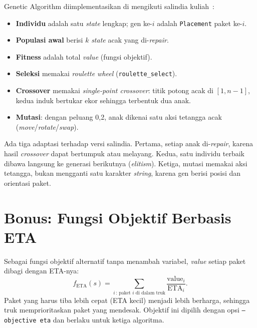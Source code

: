 Genetic Algorithm diimplementasikan di  mengikuti
salindia kuliah~\cite{kkif2026slides}:
\begin{itemize}
	\item \textbf{Individu} adalah satu \textit{state} lengkap; gen ke-$i$ adalah
	\texttt{Placement} paket ke-$i$.
	\item \textbf{Populasi awal} berisi $k$ \textit{state} acak yang di-\textit{repair}.
	\item \textbf{Fitness} adalah total \textit{value} (fungsi objektif).
	\item \textbf{Seleksi} memakai \textit{roulette wheel} (\texttt{roulette\_select}).
	\item \textbf{Crossover} memakai \textit{single-point crossover}: titik potong acak di
	$[1,n-1]$, kedua induk bertukar ekor sehingga terbentuk dua anak.
	\item \textbf{Mutasi}: dengan peluang 0,2, anak dikenai satu aksi tetangga acak
	(\textit{move}/\textit{rotate}/\textit{swap}).
\end{itemize}
Ada tiga adaptasi terhadap versi salindia. Pertama, setiap anak di-\textit{repair},
karena hasil \textit{crossover} dapat bertumpuk atau melayang. Kedua, satu individu
terbaik dibawa langsung ke generasi berikutnya (\textit{elitism}). Ketiga, mutasi
memakai aksi tetangga, bukan mengganti satu karakter \textit{string}, karena gen
berisi posisi dan orientasi paket.




\section{Bonus: Fungsi Objektif Berbasis ETA}

Sebagai fungsi objektif alternatif tanpa menambah variabel, \textit{value} setiap
paket dibagi dengan ETA-nya:
\begin{equation}
	f_{\text{ETA}}(s)=\sum_{i \,:\, \text{paket } i \text{ di dalam truk}} \frac{\text{value}_i}{\text{ETA}_i}.
\end{equation}
Paket yang harus tiba lebih cepat (ETA kecil) menjadi lebih berharga, sehingga
truk memprioritaskan paket yang mendesak. Objektif ini dipilih dengan opsi
\texttt{--objective eta} dan berlaku untuk ketiga algoritma.

